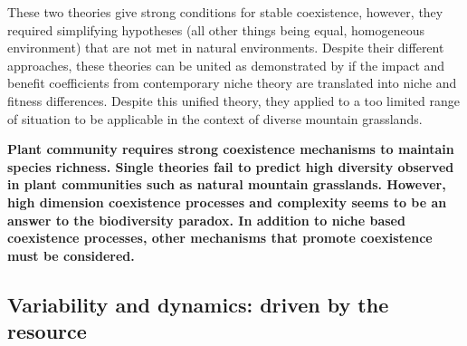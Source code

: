 These two theories give strong conditions for stable coexistence, however, they required simplifying hypotheses (all other things being equal, homogeneous environment) that are not met in natural environments. Despite their different approaches, these theories can be united as demonstrated by  \cite{letten_linking_2017} if the impact and benefit coefficients from contemporary niche theory are translated into niche and fitness differences. Despite this unified theory, they applied to a too limited range of situation to be applicable in the context of diverse mountain grasslands.
%
%
%
%
%






\textbf{Plant community requires strong coexistence mechanisms to maintain species richness. Single theories fail to predict high diversity observed in plant communities such as natural mountain grasslands. However, high dimension coexistence processes and complexity seems to be an answer to the biodiversity paradox. In addition to niche based coexistence processes, other mechanisms that promote coexistence must be considered.}




 \subsection{Variability and dynamics: driven by the resource}


